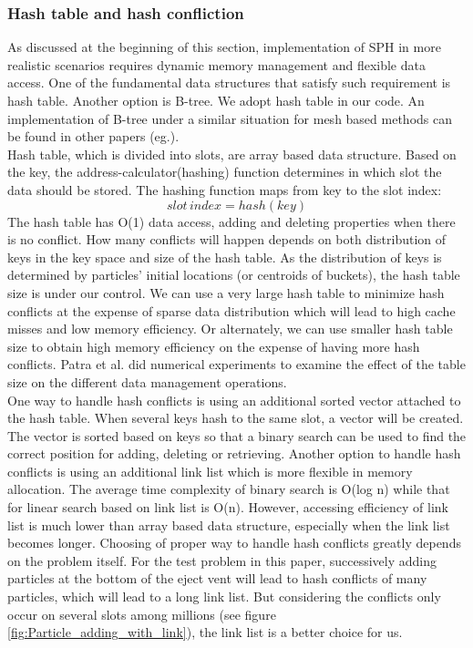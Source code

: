 \documentclass[conference,compsoc]{IEEEtran}
\begin{document}
\subsubsection{Hash table and hash confliction}
As discussed at the beginning of this section, implementation of SPH in more realistic scenarios requires dynamic memory management and flexible data access. One of the fundamental data structures that satisfy such requirement is hash table. Another option is B-tree. We adopt hash table in our code. An implementation of B-tree under a similar situation for mesh based methods can be found in other papers (eg.\cite{patra2003data}).\\
Hash table, which is divided into slots, are array based data structure. Based on the key, the address-calculator(hashing) function determines in which slot the data should be stored. The hashing function maps from key to the slot index:
\begin{equation}
slot\,index = hash(key)
\end{equation}
The hash table has O(1) data access, adding and deleting properties when there is no conflict. How many conflicts will happen depends on both distribution of keys in the key space and size of the hash table. As the distribution of keys is determined by particles' initial locations (or centroids of buckets), the hash table size is under our control. We can use a very large hash table to minimize hash conflicts at the expense of sparse data distribution which will lead to high cache misses and low memory efficiency. Or alternately, we can use smaller hash table size to obtain high memory efficiency on the expense of having more hash conflicts. Patra et al.\cite{patra2003data} did numerical experiments to examine
the effect of the table size on the different data management operations.\\
One way to handle hash conflicts is using an additional sorted vector attached to the hash table. When several keys hash to the same slot, a vector will be created. The vector is sorted based on keys so that a binary search can be used to find the correct position for adding, deleting or retrieving. Another option to handle hash conflicts is using an additional link list which is more flexible in memory allocation. The average time complexity of binary search is O(log n) while that for linear search based on link list is O(n). However, accessing efficiency of link list is much lower than array based data structure, especially when the link list becomes longer. Choosing of proper way to handle hash conflicts greatly depends on the problem itself. For the test problem in this paper, successively adding particles at the bottom of the eject vent will lead to hash conflicts of many particles, which will lead to a long link list. But considering the conflicts only occur on several slots among millions (see figure \ref{fig:Particle_adding_with_link}), the link list is a better choice for us. 
\end{document}

